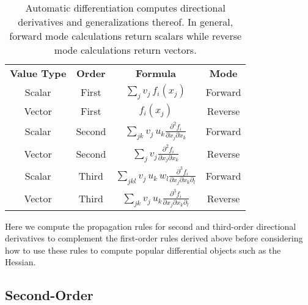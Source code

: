 \begin{table*}[t!]
	\centering
	\renewcommand{\arraystretch}{2}
	\begin{tabular}{cccc}
	\rowcolor[gray]{0.9} \textbf{Value Type} & \textbf{Order} 
	& \textbf{Formula} & \textbf{Mode} 
	\\
	Scalar & First & 
	$ \displaystyle \sum_{j} v_{j} \, f_{i} \! \left( x_{j} \right)$ & Forward
	\\
	\rowcolor[gray]{0.9}
	Vector & First & 
	$ \displaystyle  f_{i} \! \left( x_{j} \right)$ & Reverse
	\\
	Scalar & Second & 
	$ \displaystyle \sum_{jk} v_{j} \, u_{k} \frac{ \partial^{2} f_{i} }{ \partial x_{j} \partial x_{k} }$ 
	& Forward
	\\
	\rowcolor[gray]{0.9}
	Vector & Second & 
	$ \displaystyle \sum_{j} v_{j} \frac{ \partial^{2} f_{i} }{ \partial x_{j} \partial x_{k} }$  
	& Reverse
	\\
	Scalar & Third & 
	$ \displaystyle \sum_{jkl} v_{j} \, u_{k} \, w_{l} 
	\frac{ \partial^{3} f_{i} }{ \partial x_{j} \partial x_{k} \partial_{l}}$  
	& Forward
	\\
	\rowcolor[gray]{0.9}
	Vector & Third & 
	$\displaystyle \sum_{jk} v_{j} \, u_{k} \frac{ \partial^{3} f_{i} }{ \partial x_{j} \partial x_{k} \partial_{l}}$
	& Reverse
	\\
	\end{tabular}
	\caption{Automatic differentiation computes directional derivatives and
	generalizations thereof.  In general, forward mode calculations return
	scalars while reverse mode calculations return vectors.
	\label{tab:directDerivs}}
\end{table*}

Here we compute the propagation rules for second and third-order directional 
derivatives to complement the first-order rules derived above before considering 
how to use these rules to compute popular differential objects such as the Hessian.

\subsection*{Second-Order}

